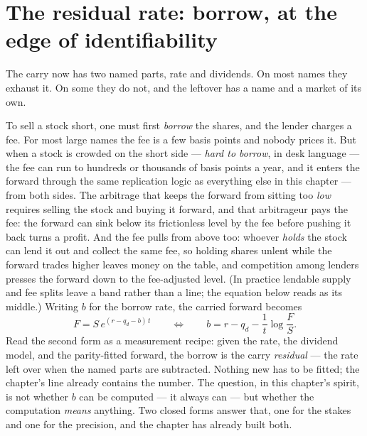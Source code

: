 \section{The residual rate: borrow, at the edge of identifiability}
\label{sec:fwdborrow}

The carry now has two named parts, rate and dividends.  On most
names they exhaust it.  On some they do not, and the leftover
has a name and a market of its own.

To sell a stock short, one must first \emph{borrow} the shares, and
the lender charges a fee.  For most large names the fee is a few
basis points and nobody prices it.  But when a stock is crowded on
the short side --- \emph{hard to borrow}, in desk language --- the
fee can run to hundreds or thousands of basis points a year, and it
enters the forward through the same replication logic as everything
else in this chapter --- from both sides.  The arbitrage that keeps
the forward from sitting too \emph{low} requires selling the stock
and buying it forward, and that arbitrageur pays the fee: the
forward can sink below its frictionless level by the fee before
pushing it back turns a profit.  And the fee pulls from above too:
whoever \emph{holds} the stock can lend it out and collect the same
fee, so holding shares unlent while the forward trades higher leaves
money on the table, and competition among lenders presses the
forward down to the fee-adjusted level.  (In practice lendable
supply and fee splits leave a band rather than a line; the equation
below reads as its middle.)  Writing $b$ for the borrow rate, the
carried forward becomes
\begin{equation}
F=S\,e^{(r-q_d-b)\,t}
\qquad\Longleftrightarrow\qquad
b=r-q_d-\frac1t\log\frac FS .
\label{eq:fwdborrowdef}
\end{equation}
Read the second form as a measurement recipe: given the rate, the
dividend model, and the parity-fitted forward, the borrow is the
carry \emph{residual} --- the rate left over when the named parts are
subtracted.  Nothing new has to be fitted; the chapter's line already
contains the number.  The question, in this chapter's spirit, is not
whether $b$ can be computed --- it always can --- but whether the
computation \emph{means} anything.  Two closed forms answer that, one
for the stakes and one for the precision, and the chapter has already
built both.

